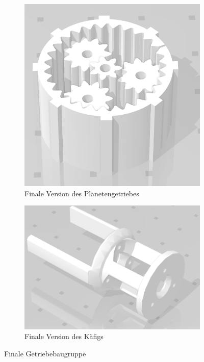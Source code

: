 \begin{figure}[!ht]
	\centering
	\begin{subfigure}[b]{0.4\textwidth}
		\includegraphics[width=\textwidth]{bilder/currGetr.png}
		\caption{Finale Version des Planetengetriebes}
		\label{bild:currGetr}
	\end{subfigure}
	\hspace{0.1\textwidth}%
	\begin{subfigure}[b]{0.4\textwidth}
		\includegraphics[width=\textwidth]{bilder/currKaefig.png}
		\caption{Finale Version des Käfigs}
		\label{bild:currKaefig}
	\end{subfigure}
	\caption{Finale Getriebebaugruppe}
\end{figure}


